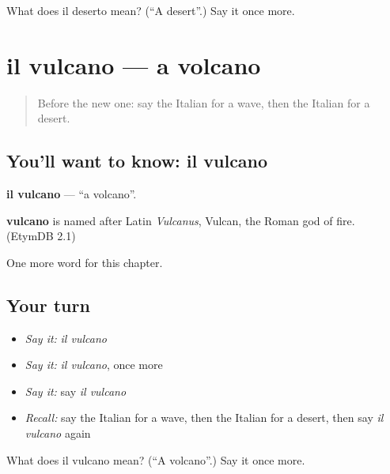 \begin{tcolorbox}[breakable,colback=teal!4,colframe=teal!35!black,title={Before you move on}]
What does il deserto mean? (\textquotedblleft{}A desert\textquotedblright{}.) Say it once more.
\end{tcolorbox}
\section[il vulcano]{il vulcano — a volcano}

\label{lesson:IT-C119-vulcano}



\begin{quote}
Before the new one: say the Italian for a wave, then the Italian for a desert.
\end{quote}

\subsection*{You'll want to know: il vulcano}
\textbf{il vulcano} — \textquotedblleft{}a volcano\textquotedblright{}.

\begin{cousinweb}
\textbf{vulcano} is named after Latin \emph{Vulcanus}, Vulcan, the Roman god of fire. (EtymDB 2.1)
\end{cousinweb}

\begin{grammarlens}[title={What you've built}]
One more word for this chapter.
\end{grammarlens}

\subsection*{Your turn}
\begin{itemize}
\raggedright
  \item \emph{Say it:} \emph{il vulcano}
  \item \emph{Say it:} \emph{il vulcano}, once more
  \item \emph{Say it:} say \emph{il vulcano}
  \item \emph{Recall:} say the Italian for a wave, then the Italian for a desert, then say \emph{il vulcano} again
\end{itemize}

\begin{tcolorbox}[breakable,colback=teal!4,colframe=teal!35!black,title={Before you move on}]
What does il vulcano mean? (\textquotedblleft{}A volcano\textquotedblright{}.) Say it once more.
\end{tcolorbox}
